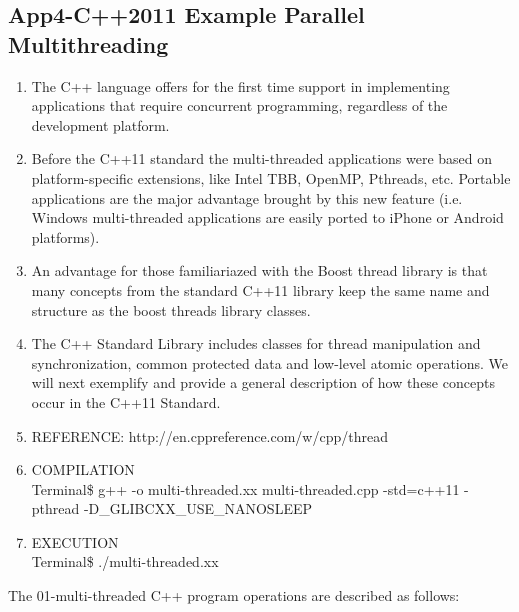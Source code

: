 
\subsection{App4-C++2011 Example Parallel Multithreading}

\begin{enumerate}
	\item The C++ language offers for the first time support in implementing applications that require concurrent programming, regardless of the development platform. 
	
	\item Before the C++11 standard the multi-threaded applications were based on platform-specific extensions, like Intel TBB, OpenMP, Pthreads, etc. Portable applications are the major advantage brought by this new feature (i.e. Windows multi-threaded applications are easily ported to iPhone or Android platforms). 
	
	\item An advantage for those familiariazed with the Boost thread library is that many concepts from the standard C++11 library keep the same name and structure as the boost threads library classes.
	
	\item The C++ Standard Library includes classes for thread manipulation and synchronization, common protected data and low-level atomic operations. We will next exemplify and provide a general description of how these concepts occur in the C++11 Standard.
	
	\item REFERENCE: http://en.cppreference.com/w/cpp/thread
	
	\item COMPILATION \\
	Terminal\$ g++ -o multi-threaded.xx multi-threaded.cpp -std=c++11 -pthread -D\_GLIBCXX\_USE\_NANOSLEEP 
	
	\item EXECUTION\\
	Terminal\$ ./multi-threaded.xx 
	
\end{enumerate}
The 01-multi-threaded C++ program operations are described as follows: 
